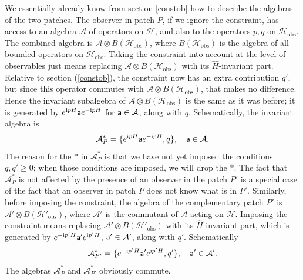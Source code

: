 \documentclass[11pt,a4paper]{article}
\def\a{{\sf a}}
\def\be{\begin{equation}}
\def\ee{\end{equation}}
\def\h{\widehat}
\def\A{{\mathcal A}}
\def\h{\widehat}
\def\H{{\mathcal H}}
\def\obs{{\mathrm{obs}}}
\def\i{{\mathrm i}}
\begin{document}
We essentially already know from section \ref{constob} how to describe the algebras of the two patches.   The observer in patch $P$, if we ignore the constraint,
has access to an algebra $\A$ of operators on $\H$, and also to the operators $p,q$ on $\H_\obs$.   The combined algebra is $\A\otimes B(\H_\obs)$, where 
$B(\H_\obs)$ is the algebra of all bounded operators on $\H_\obs$.   Taking the constraint into account at the level of observables just means replacing $\A\otimes B(\H_\obs)$ with its $\h H$-invariant part.    Relative to section (\ref{constob}), the constraint now has an extra contribution $q'$, but since this operator commutes
with $\A\otimes B(\H_\obs)$, that makes no difference.   Hence the invariant subalgebra of $\A\otimes B(\H_\obs)$ is the same as it was before; it is generated by
$e^{\i p H}\a e^{-\i p H}$ for $\a\in \A$, along with $q$.   Schematically, the invariant algebra is
\be\label{welfo} \A^*_P= \{e^{\i p H}\a e^{-\i p H},q\},~~~\a\in \A .\ee  
The reason for the $*$ in $\A_P^*$ is that we have not yet imposed the conditions $q,q'\geq 0$; when those conditions are imposed, we will drop the $*$.
 The fact that $\A_P^*$ is not affected by the presence of an observer in the patch $P'$ is a special
case of the fact that an observer in patch $P$ does not know what is in $P'$.   
Similarly, before imposing the constraint, the algebra of the complementary patch $P'$ is $\A'\otimes B(\H'_\obs)$, where $\A'$ is the commutant of
$\A$ acting on $\H$.      
Imposing the constraint means replacing $\A'\otimes B(\H'_\obs)$ with its $\h H$-invariant part, which is generated by $e^{-\i p' H}\a' e^{\i p' H}$, $\a'\in
\A'$, along with $q'$.  Schematically
\be\label{zelfo} \A_{P'}^*   =\{ e^{-\i p' H}\a' e^{\i p' H},q'\}, ~~~\a'\in\A'.\ee
The algebras $\A_P^*$ and $\A_{P'}^*$ obviously commute.
\end{document}
